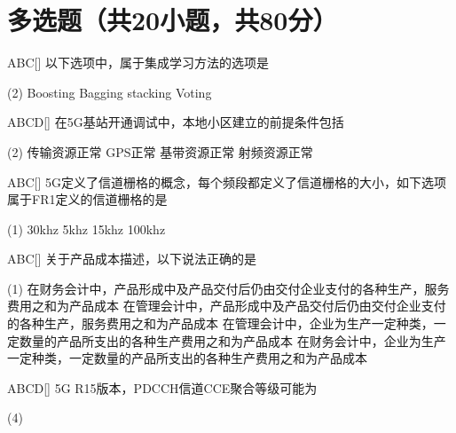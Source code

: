 \section{多选题（共20小题，共80分）}

\begin{choice}{\;ABC\;}[]
    以下选项中，属于集成学习方法的选项是
    \begin{tasks}(2)
        \task Boosting
        \task Bagging
        \task stacking
        \task Voting
    \end{tasks}
\end{choice}

\begin{choice}{\;ABCD\;}[]
    在5G基站开通调试中，本地小区建立的前提条件包括
    \begin{tasks}(2)
        \task 传输资源正常
        \task GPS正常
        \task 基带资源正常
        \task 射频资源正常
    \end{tasks}
\end{choice}

\begin{choice}{\;ABC\;}[]
    5G定义了信道栅格的概念，每个频段都定义了信道栅格的大小，如下选项属于FR1定义的信道栅格的是
    \begin{tasks}(1)
        \task 30khz
        \task 5khz
        \task 15khz
        \task 100khz
    \end{tasks}
\end{choice}

\begin{choice}{\;ABC\;}[]
    关于产品成本描述，以下说法正确的是
    \begin{tasks}(1)
        \task 在财务会计中，产品形成中及产品交付后仍由交付企业支付的各种生产，服务费用之和为产品成本
        \task 在管理会计中，产品形成中及产品交付后仍由交付企业支付的各种生产，服务费用之和为产品成本
        \task 在管理会计中，企业为生产一定种类，一定数量的产品所支出的各种生产费用之和为产品成本
        \task 在财务会计中，企业为生产一定种类，一定数量的产品所支出的各种生产费用之和为产品成本
    \end{tasks}
\end{choice}


\begin{choice}{\;ABCD\;}[]
    5G R15版本，PDCCH信道CCE聚合等级可能为
    \begin{tasks}(4)
    \end{tasks}
\end{choice}

